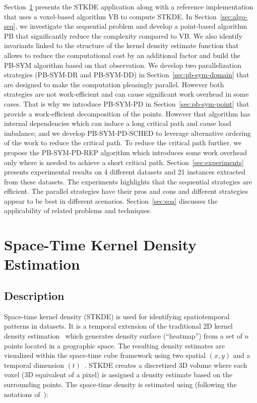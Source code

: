 \documentclass[10pt, conference, compsocconf]{IEEEtran}
\begin{document}
Section~\ref{sec:stkde} presents the STKDE application along with a
reference implementation that uses a voxel-based algorithm VB to
compute STKDE. In Section~\ref{sec:algo-seq}, we investigate the
sequential problem and develop a point-based algorithm PB that
significantly reduce the complexity compared to VB. We also identify
invariants linked to the structure of the kernel density estimate
function that allows to reduce the computational cost by an additional
factor and build the PB-SYM algorithm based on that observation. We
develop two parallelization strategies (PB-SYM-DR and PB-SYM-DD) in
Section~\ref{sec:pb-sym-domain} that are designed to make the
computation pleasingly parallel. However both strategies are not work-efficient
and can cause significant work overhead in some cases. That
is why we introduce PB-SYM-PD in Section~\ref{sec:pb-sym-point} that
provide a work-efficient decomposition of the points. However that
algorithm has internal dependencies which can induce a long critical path
and cause load imbalance; and we develop PB-SYM-PD-SCHED to leverage
alternative ordering of the work to reduce the critical path. To
reduce the critical path further, we propose the PB-SYM-PD-REP algorithm which
introduces some work
overhead only where is needed to achieve a short critical path.
Section~\ref{sec:experiments} presents experimental
results on 4 different datasets and 21 instances extracted from
these datasets. The experiments highlights that the sequential
strategies are efficient. The parallel strategies have their pros and
cons and different strategies appear to be best in different
scenarios. Section~\ref{sec:soa} discusses the applicability of related problems and
techniques.

\section{Space-Time Kernel Density Estimation}
\label{sec:stkde}

\subsection{Description}

Space-time kernel density (STKDE) is used for identifying
spatiotemporal patterns in datasets. It is a temporal
extension of the traditional 2D kernel density
estimation~\cite{Silverman86} which generates density surface
(``heatmap'') from a set of $n$ points located in a geographic space. The resulting density
estimates are visualized within the space-time cube framework using two spatial $(x,
y)$ and a temporal dimension $(t)$~\cite{Nakaya10}. STKDE creates a discretized 3D
 volume where each voxel (3D equivalent of a pixel) is assigned a
density estimate based on the surrounding points. The space-time
density is estimated using (following the notations
of~\cite{Hohl16}):
\end{document}
